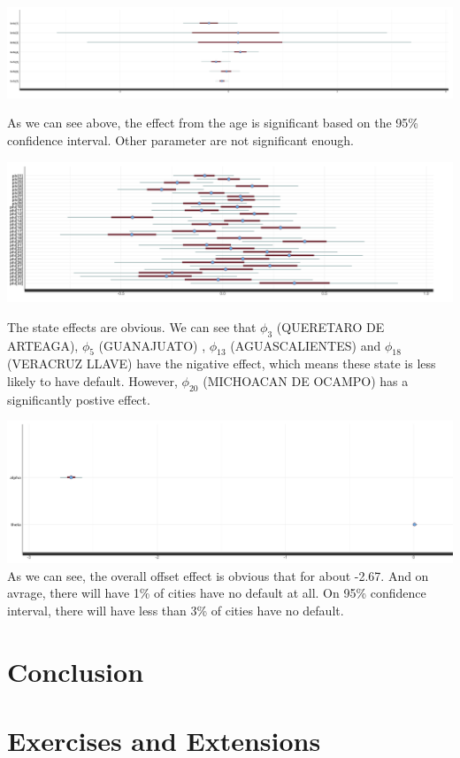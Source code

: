 \documentclass[]{tufte-handout}
\begin{document}
\includegraphics{./pic/posterior-distribution-of-betas.png}

As we can see above, the effect from the age is significant based on the
95\% confidence interval. Other parameter are not significant enough.

\includegraphics{./pic/posterior-distribution-of-state-effects.png}

The state effects are obvious. We can see that \(\phi_3\) (QUERETARO DE
ARTEAGA), \(\phi_5\) (GUANAJUATO) , \(\phi_{13}\) (AGUASCALIENTES) and
\(\phi_{18}\) (VERACRUZ LLAVE) have the nigative effect, which means
these state is less likely to have default. However, \(\phi_{20}\)
(MICHOACAN DE OCAMPO) has a significantly postive effect.

\includegraphics{./pic/posterior-distribution-of-theta-alpha.png} As we
can see, the overall offset effect is obvious that for about -2.67. And
on avrage, there will have 1\% of cities have no default at all. On 95\%
confidence interval, there will have less than 3\% of cities have no
default.

\hypertarget{conclusion}{%
\section{Conclusion}\label{conclusion}}

\hypertarget{exercises-and-extensions}{%
\section{Exercises and Extensions}\label{exercises-and-extensions}}
\end{document}
